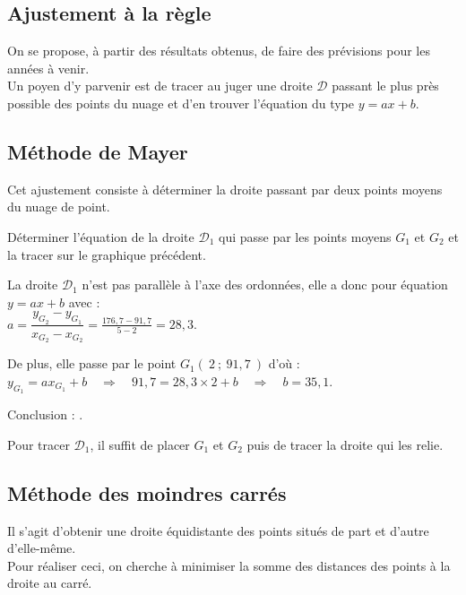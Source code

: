 \documentclass[french]{book}
\begin{document}
\subsection{Ajustement à la règle}

On se propose, à partir des résultats obtenus, de faire des prévisions pour les années à venir. \\
Un poyen d'y parvenir est de tracer au juger une droite $\mathcal{D}$ passant le plus près possible des points du nuage et d'en trouver l'équation du type $y=ax+b$.


\subsection{Méthode de Mayer}

Cet ajustement consiste à déterminer la droite passant par deux points moyens du nuage de point.


\begin{exemple}
   Déterminer l'équation de la droite $\mathcal{D}_1$ qui passe par les points moyens $G_1$ et $G_2$ et la tracer sur le graphique précédent.
\end{exemple}

La droite $\mathcal{D}_1$ n'est pas parallèle à l'axe des ordonnées, elle a donc pour équation $y=ax+b$ avec : \\
$a=\dfrac{y_{G_2}-y_{G_1}}{x_{G_2}-x_{G_2}}=\frac{176,7-91,7}{5-2}=28,3$.

De plus, elle passe par le point $G_1(~2~;~91,7~)$ d'où : \\
$y_{G_1}=ax_{G_1}+b \quad \Rightarrow \quad 91,7=28,3\times 2+b \quad \Rightarrow \quad b=35,1$.

Conclusion : .

Pour tracer $\mathcal{D}_1$, il suffit de placer $G_1$ et $G_2$ puis de tracer la droite qui les relie.


\subsection{Méthode des moindres carrés}

Il s'agit d'obtenir une droite équidistante des points situés de part et d'autre d'elle-même. \\
Pour réaliser ceci, on cherche à minimiser la somme des distances des points à la droite au carré.
\end{document}
